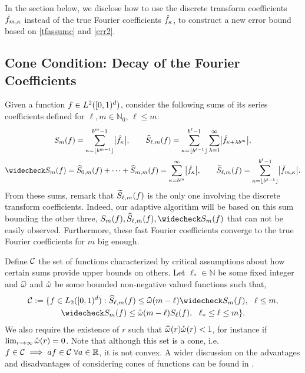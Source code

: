\documentclass[graybox]{svmult}
\newcommand{\R}{\mathbb{R}} %
\newcommand{\N}{\mathbb{N}} %
\begin{document}
In the section below, we disclose how to use the discrete transform coefficients $\tilde{f}_{m,\kappa}$ instead of the true Fourier coefficients $\hat{f}_{\kappa}$, to construct a new error bound based on \eqref{tfassumc} and \eqref{err2}.

\subsection{Cone Condition: Decay of the Fourier Coefficients}\label{sumscoeff}
Given a function $f\in L^2([0,1)^d)$, consider the following sums of its series coefficients defined for $\ell,m \in \N_0$, $\ell \le m$:
\begin{gather*}
S_m(f) =  \sum_{\kappa=\left \lfloor b^{m-1} \right \rfloor}^{b^{m}-1} \bigabs{\hf_{\kappa}}, \qquad 
\hS_{\ell,m}(f)  = \sum_{\kappa=\left \lfloor b^{\ell-1} \right \rfloor}^{b^{\ell}-1} \sum_{\lambda=1}^{\infty} \bigabs{ \hf_{\kappa+\lambda b^{m}}}, \\
\wcS_m(f)=\hS_{0,m}(f) + \cdots + \hS_{m,m}(f)=
\sum_{\kappa=b^{m}}^{\infty} \bigabs{\hf_{\kappa}}, \qquad
\tS_{\ell,m}(f) = \sum_{\kappa=\left \lfloor b^{\ell-1}\right \rfloor}^{b^{\ell}-1} \bigabs{\tf_{m,\kappa}}.
\end{gather*}
From these sums, remark that $\widetilde{S}_{\ell,m}(f)$ is the only one involving the discrete transform coefficients. Indeed, our adaptive algorithm will be based on this sum bounding the other three, $S_m(f),\hS_{\ell,m}(f),\wcS_m(f)$ that can not be easily observed. Furthermore, these fast Fourier coefficients converge to the true Fourier coefficients for $m$ big enough.

Define $\mathcal{C}$ the set of functions characterized by critical assumptions about how certain sums provide upper bounds on others.  Let $\ell_* \in \N$ be some fixed integer and $\widehat{\omega}$ and $\mathring{\omega}$ be some bounded non-negative valued functions such that,
\begin{multline} \label{conecond}
\cc:=\{f \in \Lebesgue_2(\cube) : \hS_{\ell,m}(f) \le \homega(m-\ell) \wcS_m(f),\ \ \ell \le m, \\
\wcS_m(f) \le \wcomega(m-\ell) S_{\ell}(f),\ \  \ell_* \le \ell \le m\}.
\end{multline}
We also require the existence of $r$ such that $\widehat{\omega}(r) \mathring{\omega}(r)<1$, for instance if $\lim_{r\rightarrow\infty}\mathring{\omega}(r)=0$. Note that although this set is a cone, i.e. $f \in \cc \implies af \in \cc\;\forall a\in\R$, it is not convex. A wider discussion on the advantages and disadvantages of considering cones of functions can be found in \cite{Clancy201421}.
\end{document}
